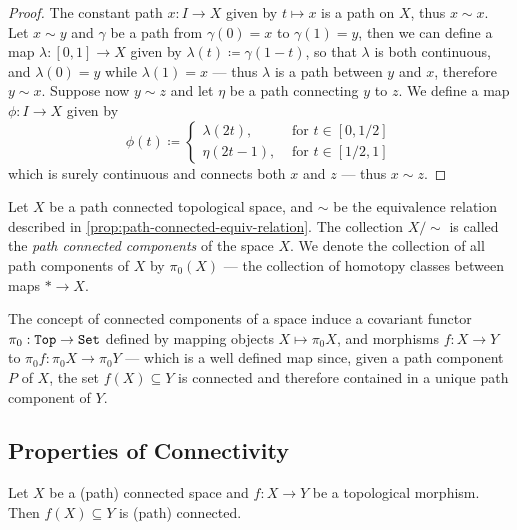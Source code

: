 \begin{proof}
The constant path \(x: I \to X\) given by \(t \mapsto x\) is a path on \(X\),
thus \(x \sim x\). Let \(x \sim y\) and \(\gamma\) be a path from
\(\gamma(0) = x\) to \(\gamma(1) = y\), then we can define a map
\(\lambda: [0, 1] \to X\) given by \(\lambda(t) \coloneq \gamma(1 - t)\), so
that \(\lambda\) is both continuous, and \(\lambda(0) = y\) while
\(\lambda(1) = x\) --- thus \(\lambda\) is a path between \(y\) and \(x\),
therefore \(y \sim x\). Suppose now \(y \sim z\) and let \(\eta\) be a path
connecting \(y\) to \(z\). We define a map \(\phi: I \to X\) given by
\[
  \phi(t) \coloneq
  \begin{cases}
    \lambda(2t), &\text{ for } t \in [0, 1/2] \\
    \eta(2t - 1), &\text{ for } t \in [1/2, 1]
  \end{cases}
\]
which is surely continuous and connects both \(x\) and \(z\) --- thus \(x \sim
z\).
\end{proof}

\begin{definition}
\label{def:path-connected-components}
Let \(X\) be a path connected topological space, and \(\sim\) be the equivalence
relation described in \cref{prop:path-connected-equiv-relation}. The collection
\(X/{\sim}\) is called the \emph{path connected components} of the space
\(X\). We denote the collection of all path components of \(X\) by \(\pi_0(X)\)
--- the collection of homotopy classes between maps \(* \to X\).
\end{definition}

\begin{definition}[\(\pi_0\) functor]
\label{def:pi0-functor}
The concept of connected components of a space induce a covariant functor
\(\pi_0: {\texttt{Top}} \to {\texttt{Set}}\) defined by mapping objects \(X \mapsto \pi_0 X\), and
morphisms \(f: X \to Y\) to \(\pi_0 f: \pi_0 X \to \pi_0 Y\) --- which is a well
defined map since, given a path component \(P\) of \(X\), the set \(f(X)
\subseteq Y\) is connected and therefore contained in a unique path component of
\(Y\).
\end{definition}

\subsection{Properties of Connectivity}

\begin{theorem}
\label{thm:morphisms-preserve-connectivity}
Let \(X\) be a (path) connected space and \(f: X \to Y\) be a topological
morphism. Then \(f(X) \subseteq Y\) is (path) connected.
\end{theorem}

